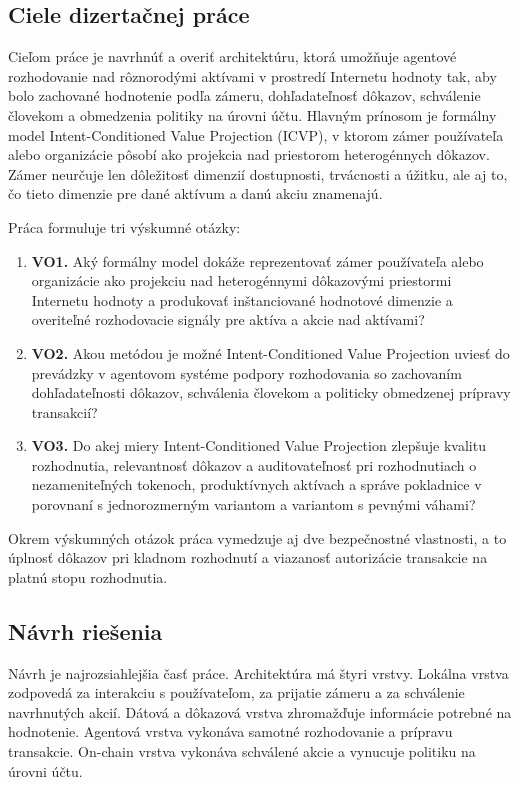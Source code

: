 \subsection{Ciele dizertačnej práce}

Cieľom práce je navrhnúť a overiť architektúru, ktorá umožňuje agentové rozhodovanie nad rôznorodými aktívami v prostredí Internetu hodnoty tak, aby bolo zachované hodnotenie podľa zámeru, dohľadateľnosť dôkazov, schválenie človekom a obmedzenia politiky na úrovni účtu. Hlavným prínosom je formálny model Intent-Conditioned Value Projection (ICVP), v ktorom zámer používateľa alebo organizácie pôsobí ako projekcia nad priestorom heterogénnych dôkazov. Zámer neurčuje len dôležitosť dimenzií dostupnosti, trvácnosti a úžitku, ale aj to, čo tieto dimenzie pre dané aktívum a danú akciu znamenajú.

Práca formuluje tri výskumné otázky:

\begin{enumerate}
   \item \textbf{VO1.} Aký formálny model dokáže reprezentovať zámer používateľa alebo organizácie ako projekciu nad heterogénnymi dôkazovými priestormi Internetu hodnoty a produkovať inštanciované hodnotové dimenzie a overiteľné rozhodovacie signály pre aktíva a akcie nad aktívami?
   \item \textbf{VO2.} Akou metódou je možné Intent-Conditioned Value Projection uviesť do prevádzky v agentovom systéme podpory rozhodovania so zachovaním dohľadateľnosti dôkazov, schválenia človekom a politicky obmedzenej prípravy transakcií?
   \item \textbf{VO3.} Do akej miery Intent-Conditioned Value Projection zlepšuje kvalitu rozhodnutia, relevantnosť dôkazov a auditovateľnosť pri rozhodnutiach o nezameniteľných tokenoch, produktívnych aktívach a správe pokladnice v porovnaní s jednorozmerným variantom a variantom s pevnými váhami?
\end{enumerate}

Okrem výskumných otázok práca vymedzuje aj dve bezpečnostné vlastnosti, a to úplnosť dôkazov pri kladnom rozhodnutí a viazanosť autorizácie transakcie na platnú stopu rozhodnutia.

\subsection{Návrh riešenia}

Návrh je najrozsiahlejšia časť práce. Architektúra má štyri vrstvy. Lokálna vrstva zodpovedá za interakciu s používateľom, za prijatie zámeru a za schválenie navrhnutých akcií. Dátová a dôkazová vrstva zhromažďuje informácie potrebné na hodnotenie. Agentová vrstva vykonáva samotné rozhodovanie a prípravu transakcie. On-chain vrstva vykonáva schválené akcie a vynucuje politiku na úrovni účtu.

